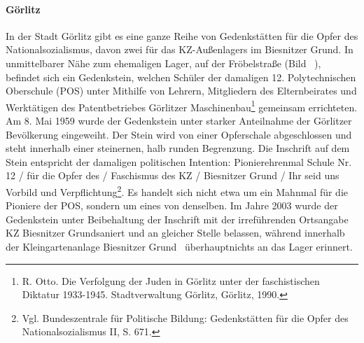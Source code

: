 
\paragraph{Görlitz}
In der Stadt Görlitz gibt es eine ganze Reihe von Gedenkstätten für die Opfer des Nationalsozialismus, davon zwei für das KZ-Außenlagers im Biesnitzer Grund. 
In unmittelbarer Nähe zum ehemaligen Lager, auf der Fröbelstraße (Bild ~), befindet sich ein Gedenkstein, welchen Schüler der damaligen 12. Polytechnischen Oberschule (POS) unter Mithilfe von \glqq Lehrern, Mitgliedern des Elternbeirates und Werktätigen des Patentbetriebes Görlitzer Maschinenbau\grqq\footnote{R. Otto. Die Verfolgung der Juden in Görlitz unter der faschistischen Diktatur
1933-1945. Stadtverwaltung Görlitz, Görlitz, 1990.}  gemeinsam errichteten. Am 8. Mai 1959 wurde der Gedenkstein unter starker Anteilnahme der Görlitzer Bevölkerung eingeweiht. Der Stein wird von einer Opferschale abgeschlossen und steht innerhalb einer steinernen, halb runden Begrenzung. Die Inschrift auf dem Stein entspricht der damaligen politischen Intention: \glqq Pionierehrenmal Schule Nr. 12 / für die Opfer des / Faschismus des KZ / Biesnitzer Grund / Ihr seid uns Vorbild und Verpflichtung\grqq\footnote{Vgl. Bundeszentrale für Politische Bildung: Gedenkstätten für die Opfer des Nationalsozialismus II, S. 671.}. Es handelt sich nicht etwa um ein Mahnmal für die Pioniere der POS, sondern um eines von denselben. Im Jahre 2003 wurde der Gedenkstein unter Beibehaltung der Inschrift mit der irreführenden Ortsangabe \glqq KZ Biesnitzer Grund\grqq saniert und an gleicher Stelle belassen, während innerhalb der Kleingartenanlage \glqq Biesnitzer Grund\grqq~ überhauptnichts an das Lager erinnert. 


